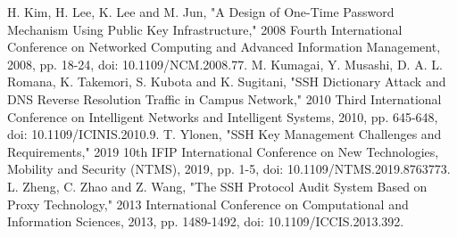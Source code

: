 \documentclass[conference]{IEEEtran}
\begin{document}
\begin{thebibliography}{00}
 H. Kim, H. Lee, K. Lee and M. Jun, "A Design of One-Time Password Mechanism Using Public Key Infrastructure," 2008 Fourth International Conference on Networked Computing and Advanced Information Management, 2008, pp. 18-24, doi: 10.1109/NCM.2008.77.
 M. Kumagai, Y. Musashi, D. A. L. Romana, K. Takemori, S. Kubota and K. Sugitani, "SSH Dictionary Attack and DNS Reverse Resolution Traffic in Campus Network," 2010 Third International Conference on Intelligent Networks and Intelligent Systems, 2010, pp. 645-648, doi: 10.1109/ICINIS.2010.9.
 T. Ylonen, "SSH Key Management Challenges and Requirements," 2019 10th IFIP International Conference on New Technologies, Mobility and Security (NTMS), 2019, pp. 1-5, doi: 10.1109/NTMS.2019.8763773.
 L. Zheng, C. Zhao and Z. Wang, "The SSH Protocol Audit System Based on Proxy Technology," 2013 International Conference on Computational and Information Sciences, 2013, pp. 1489-1492, doi: 10.1109/ICCIS.2013.392.

\end{thebibliography}
\end{document}
